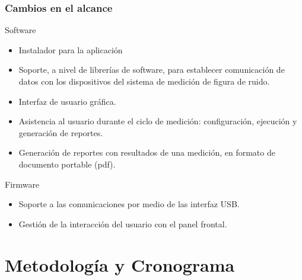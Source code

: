 \documentclass[xcolor=pdftext, table]{beamer}
\begin{document}
	\begin{frame}
		\frametitle{Cambios en el alcance}
		
		\begin{block}{Software} 
			\begin{itemize}
				\item Instalador para la aplicación
				\item Soporte, a nivel de librerías de software, para establecer comunicación de datos con los dispositivos del sistema de medición de figura de ruido.
				\item Interfaz de usuario gráfica.
				\item Asistencia al usuario durante el ciclo de medición: configuración, ejecución y generación de reportes.
				\item Generación de reportes con resultados de una medición, en formato de documento portable (pdf).
			\end{itemize}	
		\end{block}
		
		
		\begin{block}{Firmware}
			\begin{itemize}
				\item Soporte a las comunicaciones por medio de las interfaz USB.
				\item Gestión de la interacción del usuario con el panel frontal. 	
			\end{itemize}
		\end{block}
		
	\end{frame}	

	\section{Metodología y Cronograma}
	
\end{document}
